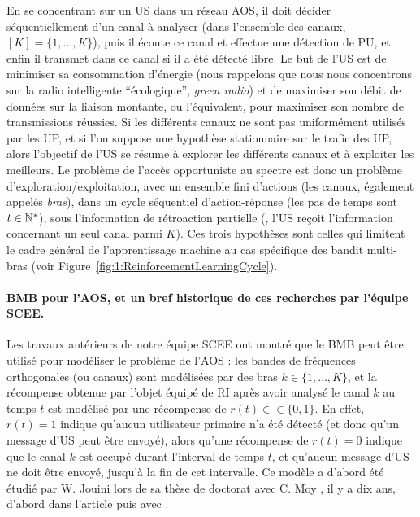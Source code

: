 \begin{resume_fr}
En se concentrant sur un US dans un réseau AOS, il doit décider séquentiellement d'un canal à analyser (dans l'ensemble des canaux, $[K]=\{1,\dots,K\}$), puis il écoute ce canal et effectue une détection de PU, et enfin il transmet dans ce canal si il a été détecté libre.
Le but de l'US est de minimiser sa consommation d'énergie (nous rappelons que nous nous concentrons sur la radio intelligente ``écologique'', \emph{green radio}) et de maximiser son débit de données sur la liaison montante, ou l'équivalent, pour maximiser son nombre de transmissions réussies.
%
Si les différents canaux ne sont pas uniformément utilisés par les UP, et si l'on suppose une hypothèse stationnaire sur le trafic des UP, alors l'objectif de l'US se résume à explorer les différents canaux et à exploiter les meilleurs.
Le problème de l'accès opportuniste au spectre est donc un problème d'exploration/exploitation, avec un ensemble fini d'actions (les canaux, également appelés \emph{bras}),
dans un cycle séquentiel d'action-réponse (les pas de temps sont $t\in\mathbb{N}^*$),
sous l'information de rétroaction partielle (\ie, l'US reçoit l'information concernant un seul canal parmi $K$).
Ces trois hypothèses sont celles qui limitent le cadre général de l'apprentissage machine au cas spécifique des bandit multi-bras (voir Figure~\ref{fig:1:ReinforcementLearningCycle}).


\paragraph{BMB pour l'AOS, et un bref historique de ces recherches par l'équipe SCEE.}
%
Les travaux antérieurs de notre équipe SCEE ont montré que le BMB peut être utilisé pour modéliser le problème de l'AOS :
les bandes de fréquences orthogonales (ou canaux) sont modélisées par des bras $k\in\{1,\dots,K\}$,
et la récompense obtenue par l'objet équipé de RI après avoir analysé le canal $k$ au temps $t$ est modélisé par une récompense de $r(t) \in \in \{0,1\}$.
En effet, $r(t) = 1$ indique qu'aucun utilisateur primaire n'a été détecté (et donc qu'un message d'US peut être envoyé), alors qu'une récompense de $r(t)=0$ indique que le canal $k$ est occupé durant l'interval de temps $t$, et qu'aucun message d'US ne doit être envoyé, jusqu'à la fin de cet intervalle.
%
Ce modèle a d'abord été étudié par W. Jouini lors de sa thèse de doctorat avec C. Moy \cite{Jouini12PhD}, il y a dix ans, d'abord dans l'article \cite{Jouini09} puis avec \cite{Jouini10,Jouini12}.


\end{resume_fr}
